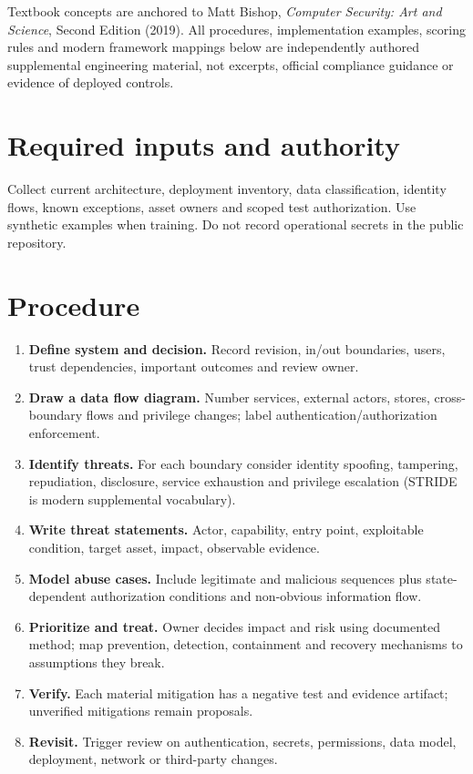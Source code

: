 \documentclass[10pt,letterpaper]{article}
\begin{document}
\makedoctocpage
\begin{notebox}
Textbook concepts are anchored to Matt Bishop, \emph{Computer Security: Art and Science}, Second Edition (2019). All procedures, implementation examples, scoring rules and modern framework mappings below are independently authored supplemental engineering material, not excerpts, official compliance guidance or evidence of deployed controls.
\end{notebox}
\section{Required inputs and authority}
Collect current architecture, deployment inventory, data classification, identity flows, known exceptions, asset owners and scoped test authorization. Use synthetic examples when training. Do not record operational secrets in the public repository.
\section{Procedure}
\begin{enumerate}
\item \textbf{Define system and decision.} Record revision, in/out boundaries, users, trust dependencies, important outcomes and review owner.
\item \textbf{Draw a data flow diagram.} Number services, external actors, stores, cross-boundary flows and privilege changes; label authentication/authorization enforcement.
\item \textbf{Identify threats.} For each boundary consider identity spoofing, tampering, repudiation, disclosure, service exhaustion and privilege escalation (STRIDE is modern supplemental vocabulary).
\item \textbf{Write threat statements.} Actor, capability, entry point, exploitable condition, target asset, impact, observable evidence.
\item \textbf{Model abuse cases.} Include legitimate and malicious sequences plus state-dependent authorization conditions and non-obvious information flow.
\item \textbf{Prioritize and treat.} Owner decides impact and risk using documented method; map prevention, detection, containment and recovery mechanisms to assumptions they break.
\item \textbf{Verify.} Each material mitigation has a negative test and evidence artifact; unverified mitigations remain proposals.
\item \textbf{Revisit.} Trigger review on authentication, secrets, permissions, data model, deployment, network or third-party changes.
\end{enumerate}
\end{document}

